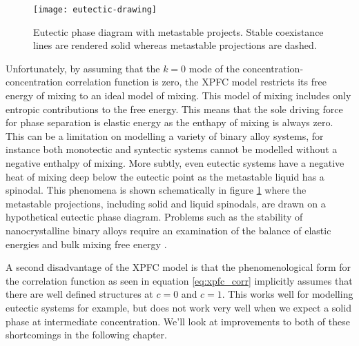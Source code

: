 \begin{figure}
    \centering
    \texttt{[image: eutectic-drawing]}
    \caption[Eutectic Phase Diagram with Metastable Projections]{
        \label{fig:eutectic_drawing} Eutectic phase diagram with metastable
        projects. Stable coexistance lines are rendered solid whereas 
        metastable projections are dashed.
    }
\end{figure}

Unfortunately, by assuming that the $k=0$ mode of the
concentration-concentration correlation function is zero, the XPFC model
restricts its free energy of mixing to an ideal model of mixing. This model
of mixing includes only entropic contributions to the free energy. This means
that the sole driving force for phase separation is elastic energy as the enthapy
of mixing is always zero. This can be a limitation on modelling a variety of binary
alloy systems, for instance both monotectic and syntectic systems cannot be
modelled without a negative enthalpy of mixing. More subtly, even eutectic systems
have a negative heat of mixing deep below the eutectic point as the metastable
liquid has a spinodal. This phenomena is shown schematically in figure
\ref{fig:eutectic_drawing} where the metastable projections, including solid
and liquid spinodals, are drawn on a hypothetical eutectic phase diagram.
Problems such as the stability of nanocrystalline binary alloys require an
examination of the balance of elastic energies and bulk mixing free energy
\cite{MURDOCH13}.

A second disadvantage of the XPFC model is that the phenomenological form for
the correlation function as seen in equation \ref{eq:xpfc_corr} implicitly
assumes that there are well defined structures at $c=0$ and $c=1$. This works
well for modelling eutectic systems for example, but does not work very well
when we expect a solid phase at intermediate concentration. We'll look at 
improvements to both of these shortcomings in the following chapter.

